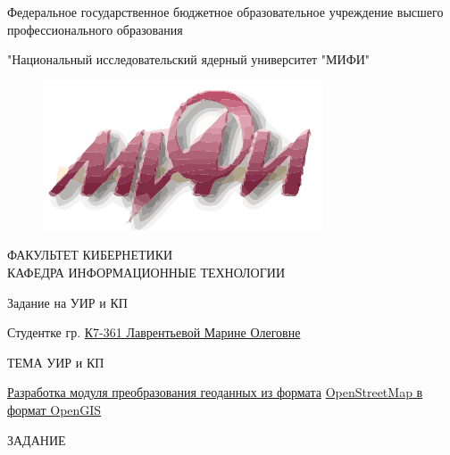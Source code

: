 \documentclass[12pt,a4paper,oneside]{article} %
\begin{document}
\singlespacing %
\pagestyle{empty} %

\newpage
\begin{center}
 \fontsize{12.5pt}{15pt}

{ \fontsize{13pt}{24pt}
\selectfont
Федеральное государственное бюджетное образовательное учреждение \linebreak
высшего профессионального образования}
\end{center}

\begin{center}
{ \fontsize{15pt}{5pt} 
\selectfont {}
"Национальный исследовательский ядерный университет "МИФИ"
\\[10pt]}

\begin{figure}[h]
\includegraphics[width=0.25\linewidth]{mifi}
\end{figure}
{ \fontsize{12pt}{14pt}
\selectfont {}
ФАКУЛЬТЕТ КИБЕРНЕТИКИ
\\[15pt]
КАФЕДРА ИНФОРМАЦИОННЫЕ ТЕХНОЛОГИИ
\\[50pt]}

{ \fontsize{24pt}{24pt}
\selectfont {}
Задание на УИР и КП
\\[20pt]}

\begin{flushleft}
{ \fontsize{14pt}{24pt}
\selectfont
Студентке гр. \underline{К7-361 Лаврентьевой Марине Олеговне\hspace{5cm}}
\\[40pt]}
\end{flushleft}

{ \fontsize{16pt}{24pt}
\selectfont 
ТЕМА УИР и КП}

\begin{flushleft}
{ \fontsize{14pt}{20pt}
\selectfont
\underline{Разработка модуля преобразования геоданных из формата\hspace{4cm}} \linebreak
\underline{OpenStreetMap в формат OpenGIS\hspace{9,4cm}}
\\[60pt]}
\end{flushleft}

{ \fontsize{14pt}{20pt}
\selectfont
ЗАДАНИЕ}
\end{center}
\end{document}
